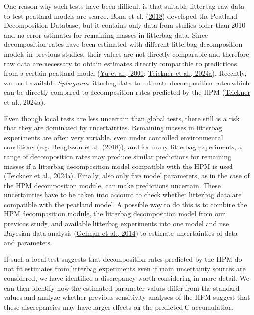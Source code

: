 \documentclass[
  12pt,
]{article}
\begin{document}
One reason why such tests have been difficult is that suitable litterbag raw data to test peatland models are scarce. Bona et al. (\protect\hyperlink{ref-Bona.2018}{2018}) developed the Peatland Decomposition Database, but it contains only data from studies older than 2010 and no error estimates for remaining masses in litterbag data. Since decomposition rates have been estimated with different litterbag decomposition models in previous studies, their values are not directly comparable and therefore raw data are necessary to obtain estimates directly comparable to predictions from a certain peatland model (\protect\hyperlink{ref-Yu.2001}{Yu et al., 2001}; \protect\hyperlink{ref-Teickner.2024}{Teickner et al., 2024a}). Recently, we used available \emph{Sphagnum} litterbag data to estimate decomposition rates which can be directly compared to decomposition rates predicted by the HPM (\protect\hyperlink{ref-Teickner.2024}{Teickner et al., 2024a}).

Even though local tests are less uncertain than global tests, there still is a risk that they are dominated by uncertainties. Remaining masses in litterbag experiments are often very variable, even under controlled environmental conditions (e.g. Bengtsson et al. (\protect\hyperlink{ref-Bengtsson.2018}{2018})), and for many litterbag experiments, a range of decomposition rates may produce similar predictions for remaining masses if a litterbag decomposition model compatible with the HPM is used (\protect\hyperlink{ref-Teickner.2024}{Teickner et al., 2024a}). Finally, also only five model parameters, as in the case of the HPM decomposition module, can make predictions uncertain. These uncertainties have to be taken into account to check whether litterbag data are compatible with the peatland model. A possible way to do this is to combine the HPM decomposition module, the litterbag decomposition model from our previous study, and available litterbag experiments into one model and use Bayesian data analysis (\protect\hyperlink{ref-Gelman.2014}{Gelman et al., 2014}) to estimate uncertainties of data and parameters.

If such a local test suggests that decomposition rates predicted by the HPM do not fit estimates from litterbag experiments even if main uncertainty sources are considered, we have identified a discrepancy worth considering in more detail. We can then identify how the estimated parameter values differ from the standard values and analyze whether previous sensitivity analyses of the HPM suggest that these discrepancies may have larger effects on the predicted C accumulation.
\end{document}
